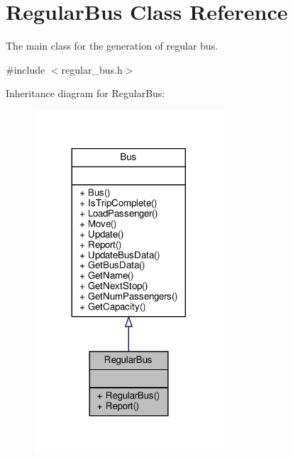 \hypertarget{classRegularBus}{}\section{Regular\+Bus Class Reference}
\label{classRegularBus}


The main class for the generation of regular bus.  




{\ttfamily \#include $<$regular\+\_\+bus.\+h$>$}



Inheritance diagram for Regular\+Bus\+:\nopagebreak
\begin{figure}[H]
\begin{center}
\leavevmode
\includegraphics[width=200pt]{classRegularBus__inherit__graph}
\end{center}
\end{figure}


